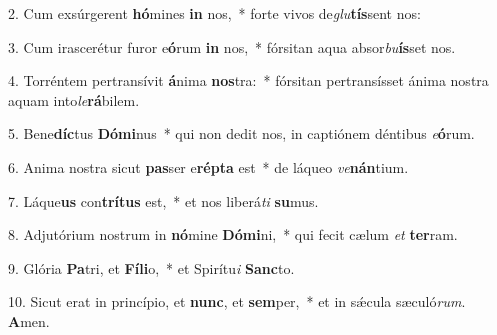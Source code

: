 2. Cum exsúrgerent \textbf{hó}mines \textbf{in} nos,~*  forte vivos de\textit{glu}\textbf{tís}sent nos:\

3. Cum irascerétur furor e\textbf{ó}rum \textbf{in} nos,~*  fórsitan aqua absor\textit{bu}\textbf{ís}set nos.\

4. Torréntem pertransívit \textbf{á}nima \textbf{nos}tra:~*  fórsitan pertransísset ánima nostra aquam into\textit{le}\textbf{rá}bilem.\

5. Bene\textbf{díc}tus \textbf{Dó}\textbf{mi}nus~*  qui non dedit nos, in captiónem déntibus \textit{e}\textbf{ó}rum.\

6. Anima nostra sicut \textbf{pas}ser e\textbf{rép}\textbf{ta} est~*  de láqueo \textit{ve}\textbf{nán}tium.\

7. Láque\textbf{us} con\textbf{trí}\textbf{tus} est,~*  et nos liberá\textit{ti} \textbf{su}mus.\

8. Adjutórium nostrum in \textbf{nó}mine \textbf{Dó}\textbf{mi}ni,~*  qui fecit cælum \textit{et} \textbf{ter}ram.\

9. Glória \textbf{Pa}tri, et \textbf{Fí}\textbf{li}o,~*  et Spirítu\textit{i} \textbf{Sanc}to.\

10. Sicut erat in princípio, et \textbf{nunc}, et \textbf{sem}per,~*  et in sǽcula sæculó\textit{rum}. \textbf{A}men.\

